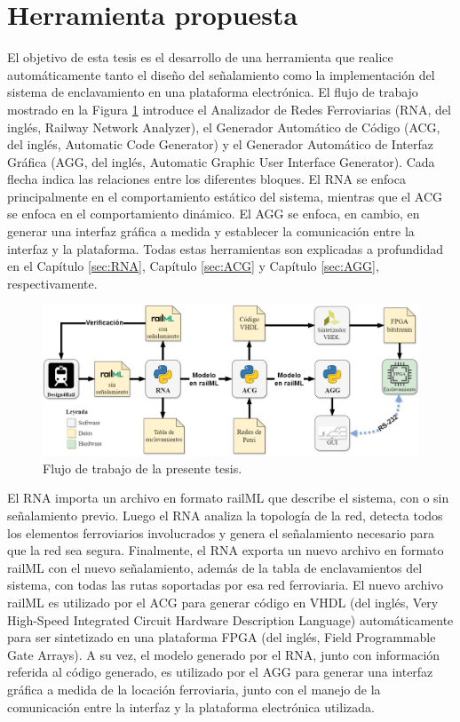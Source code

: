 \section{Herramienta propuesta}

    El objetivo de esta tesis es el desarrollo de una herramienta que realice automáticamente tanto el diseño del señalamiento como la implementación del sistema de enclavamiento en una plataforma electrónica. El flujo de trabajo mostrado en la Figura \ref{fig:workflow} introduce el Analizador de Redes Ferroviarias (RNA, del inglés, Railway Network Analyzer), el Generador Automático de Código (ACG, del inglés, Automatic Code Generator) y el Generador Automático de Interfaz Gráfica (AGG, del inglés, Automatic Graphic User Interface Generator). Cada flecha indica las relaciones entre los diferentes bloques. El RNA se enfoca principalmente en el comportamiento estático del sistema, mientras que el ACG se enfoca en el comportamiento dinámico. El AGG se enfoca, en cambio, en generar una interfaz gráfica a medida y establecer la comunicación entre la interfaz y la plataforma. Todas estas herramientas son explicadas a profundidad en el Capítulo \ref{sec:RNA}, Capítulo \ref{sec:ACG} y Capítulo \ref{sec:AGG}, respectivamente.

    \begin{figure}[H]
        \centering
        \includegraphics[width=1\textwidth]{Figuras/workflow.png}
        \centering\caption{Flujo de trabajo de la presente tesis.}
        \label{fig:workflow}
    \end{figure}

    El RNA importa un archivo en formato railML que describe el sistema, con o sin señalamiento previo. Luego el RNA analiza la topología de la red, detecta todos los elementos ferroviarios involucrados y genera el señalamiento necesario para que la red sea segura. Finalmente, el RNA exporta un nuevo archivo en formato railML con el nuevo señalamiento, además de la tabla de enclavamientos del sistema, con todas las rutas soportadas por esa red ferroviaria. El nuevo archivo railML es utilizado por el ACG para generar código en VHDL \cite{Paper_206} (del inglés, Very High-Speed Integrated Circuit Hardware Description Language) automáticamente para ser sintetizado en una plataforma FPGA \cite{Paper_8,Paper_25,Paper_34,Paper_46,Paper_49} (del inglés, Field Programmable Gate Arrays). A su vez, el modelo generado por el RNA, junto con información referida al código generado, es utilizado por el AGG para generar una interfaz gráfica a medida de la locación ferroviaria, junto con el manejo de la comunicación entre la interfaz y la plataforma electrónica utilizada.
    
